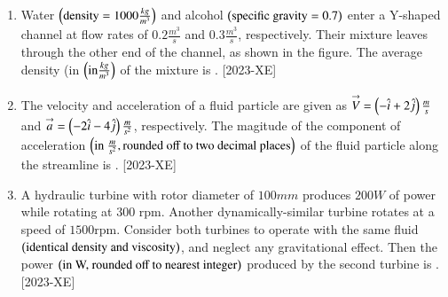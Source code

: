\documentclass[journal]{IEEEtran}
\begin{document}
\begin{enumerate}[start=27]
\begin{figure}[H]
			\centering
			
			\label{36}
		\end{figure}
\item Water $\left(\text{density} = 1000 \frac{kg}{m^3}\right)$ and alcohol $\left(\text{specific gravity} = 0.7\right)$ enter a Y-shaped channel at flow rates of $0.2 \frac{m^3}{s}$ and $0.3 \frac{m^3}{s}$, respectively. Their mixture leaves through the other end of the channel, as shown in the figure. The average density (in $\left(\text{in} \frac{kg}{m^3}\right)$ of the mixture is \underline{\hspace{1cm}}. \hfill{[2023-XE]}\\
\begin{figure}[H]
			\centering
			
			\label{37}
		\end{figure}

\item The velocity and acceleration of a fluid particle are given as $\overset{\rightarrow}{V}=\left(-\hat{i}+2\hat{j}\right) \frac{m}{s}$ and $\overset{\rightarrow}{a}=\left(-2\hat{i}-4 \hat{j}\right) \frac{m}{s^2}$, respectively. The magitude of the component of acceleration $\left(\text{in } \frac{m}{s^2}, \text{rounded off to two decimal places}\right)$ of the fluid particle along the streamline is \underline{\hspace{1cm}}. \hfill{[2023-XE]}\\
\item A hydraulic turbine with rotor diameter of $100 mm$ produces $200 W$ of power while rotating at $300\text{ rpm}$. Another dynamically-similar turbine rotates at a speed of $1500 \text{rpm}$. Consider both turbines to operate with the same fluid $\left(\text{identical density and viscosity}\right)$, and neglect any gravitational effect. Then the power $\left(\text{in W, rounded off to nearest integer}\right)$ produced by the second turbine is \underline{\hspace{1cm}}. \hfill{[2023-XE]}\\

\end{enumerate}
\end{document}
